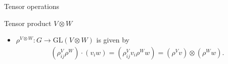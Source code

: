 \documentclass[handout, 10pt]{beamer}
\newcommand{\GL}{\text{GL}}
\begin{document}
\begin{frame}[allowframebreaks]{Tensor operations}
\begin{block}{Tensor product $V \otimes W$}
\begin{itemize}
				\item $\rho^{V \otimes W}: G \rightarrow \GL(V \otimes W)$ is given by 
				\begin{align*}
					(\rho^V_{ij} \rho^W) \cdot (v_i w)
					= (\rho^V_{ij}v_i \rho^Ww)
					= (\rho^V v) \otimes (\rho^W w).
				\end{align*}
			\end{itemize}
		\end{block}		

		

		
		
%				
	\end{frame}
	
\end{document}
